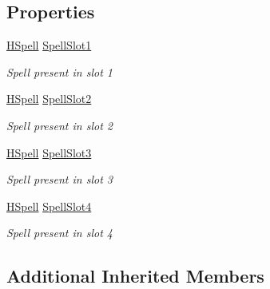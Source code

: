 \subsection*{Properties}
\begin{DoxyCompactItemize}
\item 
\hyperlink{class_hel_project_1_1_game_world_1_1_spells_1_1_h_spell}{H\+Spell} \hyperlink{class_hel_project_1_1_game_world_1_1_entities_1_1_h_hero_a8d07530c288a8af2701ffe759762b404}{Spell\+Slot1}
\begin{DoxyCompactList}\small\item\em Spell present in slot 1 \end{DoxyCompactList}\item 
\hyperlink{class_hel_project_1_1_game_world_1_1_spells_1_1_h_spell}{H\+Spell} \hyperlink{class_hel_project_1_1_game_world_1_1_entities_1_1_h_hero_ad6d1b72488cfdcdd5a6a2a013ab3aa2e}{Spell\+Slot2}
\begin{DoxyCompactList}\small\item\em Spell present in slot 2 \end{DoxyCompactList}\item 
\hyperlink{class_hel_project_1_1_game_world_1_1_spells_1_1_h_spell}{H\+Spell} \hyperlink{class_hel_project_1_1_game_world_1_1_entities_1_1_h_hero_a172d2aa2527d8bf89ba2ed3bbc1768ba}{Spell\+Slot3}
\begin{DoxyCompactList}\small\item\em Spell present in slot 3 \end{DoxyCompactList}\item 
\hyperlink{class_hel_project_1_1_game_world_1_1_spells_1_1_h_spell}{H\+Spell} \hyperlink{class_hel_project_1_1_game_world_1_1_entities_1_1_h_hero_a20b187db40947594071dd7454380f23d}{Spell\+Slot4}
\begin{DoxyCompactList}\small\item\em Spell present in slot 4 \end{DoxyCompactList}\end{DoxyCompactItemize}
\subsection*{Additional Inherited Members}


